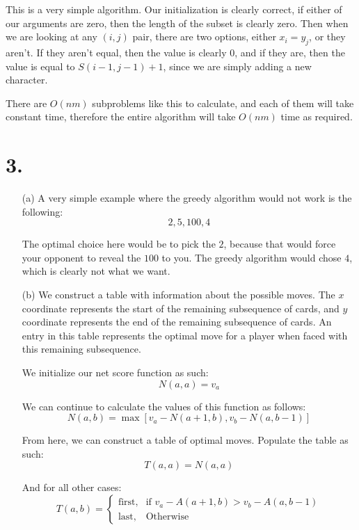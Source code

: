 \documentclass[11pt]{article}
\begin{document}
This is a very simple algorithm. Our initialization is clearly correct, if
either of our arguments are zero, then the length of the subset is clearly zero.
Then when we are looking at any $(i, j)$ pair, there are two options, either
$x_i = y_j$, or they aren't. If they aren't equal, then the value is clearly
$0$, and if they are, then the value is equal to $S(i-1, j-1) + 1$, since we are
simply adding a new character. 

There are $O(nm)$ subproblems like this to calculate, and each of them will take
constant time, therefore the entire algorithm will take $O(nm)$ time as
required.
\newpage
\section*{3.}
\begin{enumerate}
\item[(a)]
A very simple example where the greedy algorithm would not work is the
following:
\begin{equation*}
2, 5, 100, 4
\end{equation*}

The optimal choice here would be to pick the $2$, because that would force your
opponent to reveal the $100$ to you. The greedy algorithm would chose $4$, which
is clearly not what we want. 
\item[(b)]
We construct a table with information about the possible moves. The $x$
coordinate represents the start of the remaining subsequence of cards, and $y$
coordinate represents the end of the remaining subsequence of cards. An entry in
this table represents the optimal move for a player when faced with this
remaining subsequence.

We initialize our net score function as such:
\begin{equation*}
N(a, a) = v_a
\end{equation*}

We can continue to calculate the values of this function as follows:
\begin{equation*}
N(a, b) = \max[v_a - N(a+1, b), v_b - N(a, b-1)]
\end{equation*}

From here, we can construct a table of optimal moves. Populate the table as
such:
\begin{equation*}
T(a, a) = N(a, a)
\end{equation*}

And for all other cases:
\begin{equation*}
T(a, b) =
\begin{cases}
\text{first}, & \text{if } v_a - A(a+1, b) > v_b - A(a, b-1)\\
\text{last}, & \text{Otherwise}
\end{cases}
\end{equation*}
\end{enumerate}
\end{document}
